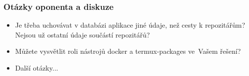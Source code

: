 \documentclass[10pt,xcolor=pdflatex]{beamer}
\begin{document}
\begin{frame}\frametitle{Otázky oponenta a diskuze}
    \begin{itemize}
        \item{Je třeba uchovávat v databázi aplikace jiné údaje, než cesty k repozitářům? Nejsou už ostatní údaje součástí repozitářů?}
        \item{Můžete vysvětlit roli nástrojů docker a termux-packages ve~Vašem řešení?}
        \item{Další otázky...}
    \end{itemize}
    \vspace{0.7cm}
    \begin{figure}[b]
    \end{figure}
\end{frame}
\end{document}
